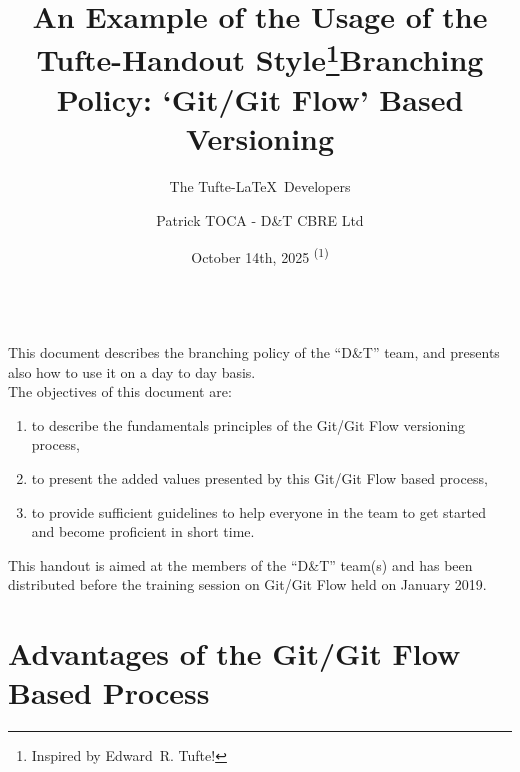 \documentclass{tufte-handout}
\title{An Example of the Usage of the Tufte-Handout Style\thanks{Inspired by Edward~R. Tufte!}}
\author[The Tufte-LaTeX Developers]{The Tufte-\LaTeX\ Developers}
\title{Branching Policy: `Git/Git Flow' Based Versioning}
\author{Patrick TOCA - D\&T CBRE Ltd}
\date{October 14th, 2025 \textsuperscript{(1)}}
\begin{document}
	
	\maketitle  			
	
	\noindent\hrulefill
	\vspace{2pt} \\	
	This document describes the branching policy of the \enquote{D\&T} team, and presents also how to use it on a day to day basis.\\
	The objectives of this document are:
	\begin{enumerate}[label=\alph*., itemsep=0.2\baselineskip, topsep=0.5\baselineskip, leftmargin=*]
		\item to describe the fundamentals principles of the Git/Git Flow versioning process,
		\item to present the added values presented by this Git/Git Flow based process,
		\item to provide sufficient guidelines to help everyone in the team to get started and become proficient in short time.
	\end{enumerate}
	
	This handout is aimed at the members of the \enquote{D\&T} team(s) and has been distributed before the training session on Git/Git Flow held on January 2019.\\
	\noindent\hrulefill
	\vspace{3pt}

	
	\section{Advantages of the Git/Git Flow Based Process}
	
\end{document}
